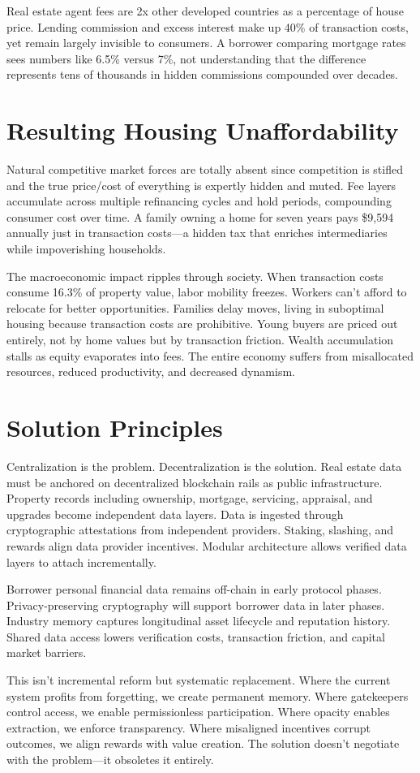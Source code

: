 Real estate agent fees are 2x other developed countries as a percentage of house price. Lending commission and excess interest make up 40\% of transaction costs, yet remain largely invisible to consumers. A borrower comparing mortgage rates sees numbers like 6.5\% versus 7\%, not understanding that the difference represents tens of thousands in hidden commissions compounded over decades.

\section{Resulting Housing Unaffordability}

Natural competitive market forces are totally absent since competition is stifled and the true price/cost of everything is expertly hidden and muted. Fee layers accumulate across multiple refinancing cycles and hold periods, compounding consumer cost over time. A family owning a home for seven years pays \$9,594 annually just in transaction costs—a hidden tax that enriches intermediaries while impoverishing households.

The macroeconomic impact ripples through society. When transaction costs consume 16.3\% of property value, labor mobility freezes. Workers can't afford to relocate for better opportunities. Families delay moves, living in suboptimal housing because transaction costs are prohibitive. Young buyers are priced out entirely, not by home values but by transaction friction. Wealth accumulation stalls as equity evaporates into fees. The entire economy suffers from misallocated resources, reduced productivity, and decreased dynamism.

\section{Solution Principles}

Centralization is the problem. Decentralization is the solution. Real estate data must be anchored on decentralized blockchain rails as public infrastructure. Property records including ownership, mortgage, servicing, appraisal, and upgrades become independent data layers. Data is ingested through cryptographic attestations from independent providers. Staking, slashing, and rewards align data provider incentives. Modular architecture allows verified data layers to attach incrementally.

Borrower personal financial data remains off-chain in early protocol phases. Privacy-preserving cryptography will support borrower data in later phases. Industry memory captures longitudinal asset lifecycle and reputation history. Shared data access lowers verification costs, transaction friction, and capital market barriers.

This isn't incremental reform but systematic replacement. Where the current system profits from forgetting, we create permanent memory. Where gatekeepers control access, we enable permissionless participation. Where opacity enables extraction, we enforce transparency. Where misaligned incentives corrupt outcomes, we align rewards with value creation. The solution doesn't negotiate with the problem—it obsoletes it entirely.